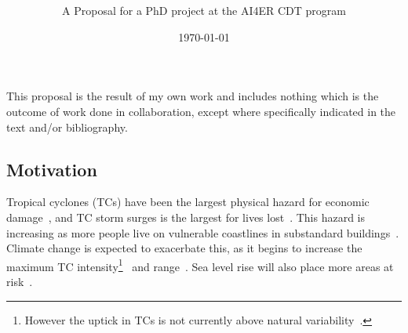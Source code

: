 \documentclass[usenames, dvipsnames]{article}      %
\title{\vspace*{-100pt}\textbf{\mytitle}\vspace{-15pt}}
\date{\vspace{-10pt}\today \vspace{-15pt}}
\author{A Proposal for a PhD project 
at the AI4ER CDT program  \\
\penname 
}
\begin{document}
\maketitle

\vspace{-10pt}\vspace{-5pt}

\footnotesize{
This proposal is the result of my own work and includes nothing which is the outcome of work done in collaboration, except where specifically indicated in the text and/or bibliography.}

\vspace{-10pt}

\normalsize

\subsection*{\vspace{-10pt}Motivation}


Tropical cyclones (TCs) have been the
largest physical hazard for economic 
damage~\cite{Chavas2013U.S.Perspective, shultz2005epidemiology},
and TC storm surges is the largest for lives
lost~\cite{shultz2005epidemiology, emanuel2005divine,
Rappaport2014FatalitiesInterpretation, zhang2009tropical}.
This hazard is increasing as more people live on vulnerable 
coastlines in substandard buildings~\cite{emanuel2005divine}.
Climate change is expected to exacerbate this,
as it begins to increase the maximum TC intensity\footnote{
However the uptick in TCs is not currently above
natural variability~\cite{mendelsohn2012impact}.}~\cite{
emanuel2008hurricanes,emanuel2017will, nordhaus2010} and
range~\cite{emanuel2008hurricanes, emanuel2017will, fedorov2010tropical}.
Sea level rise will also place 
more areas at risk~\cite{SROCC}.
\end{document}
